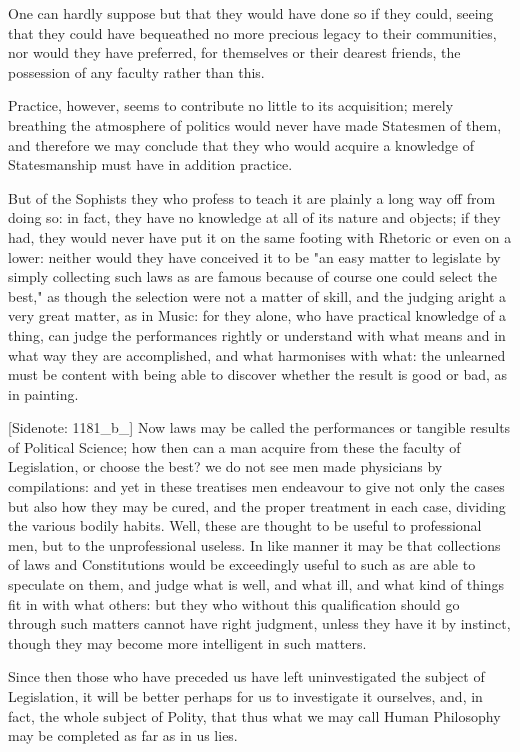 One can hardly suppose but that they would have done so if they could,
seeing that they could have bequeathed no more precious legacy to their
communities, nor would they have preferred, for themselves or their
dearest friends, the possession of any faculty rather than this.

Practice, however, seems to contribute no little to its acquisition;
merely breathing the atmosphere of politics would never have made
Statesmen of them, and therefore we may conclude that they who would
acquire a knowledge of Statesmanship must have in addition practice.

But of the Sophists they who profess to teach it are plainly a long way
off from doing so: in fact, they have no knowledge at all of its nature
and objects; if they had, they would never have put it on the same
footing with Rhetoric or even on a lower: neither would they have
conceived it to be "an easy matter to legislate by simply collecting
such laws as are famous because of course one could select the best," as
though the selection were not a matter of skill, and the judging aright
a very great matter, as in Music: for they alone, who have practical
knowledge of a thing, can judge the performances rightly or understand
with what means and in what way they are accomplished, and what
harmonises with what: the unlearned must be content with being able to
discover whether the result is good or bad, as in painting.

[Sidenote: 1181_b_] Now laws may be called the performances or tangible
results of Political Science; how then can a man acquire from these
the faculty of Legislation, or choose the best? we do not see men made
physicians by compilations: and yet in these treatises men endeavour to
give not only the cases but also how they may be cured, and the proper
treatment in each case, dividing the various bodily habits. Well, these
are thought to be useful to professional men, but to the unprofessional
useless. In like manner it may be that collections of laws and
Constitutions would be exceedingly useful to such as are able to
speculate on them, and judge what is well, and what ill, and what
kind of things fit in with what others: but they who without this
qualification should go through such matters cannot have right judgment,
unless they have it by instinct, though they may become more intelligent
in such matters.

Since then those who have preceded us have left uninvestigated the
subject of Legislation, it will be better perhaps for us to investigate
it ourselves, and, in fact, the whole subject of Polity, that thus what
we may call Human Philosophy may be completed as far as in us lies.

